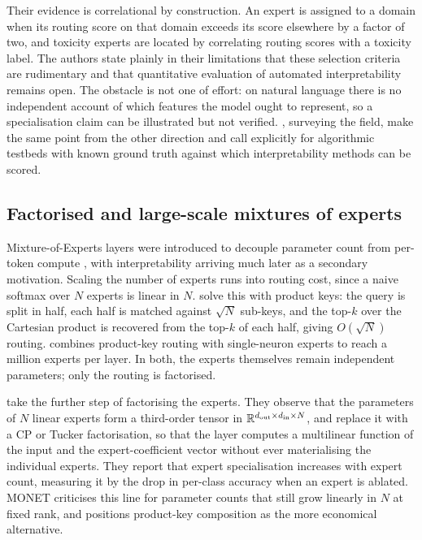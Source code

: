 Their evidence is correlational by construction. An expert is assigned to a
domain when its routing score on that domain exceeds its score elsewhere by a
factor of two, and toxicity experts are located by correlating routing scores
with a toxicity label. The authors state plainly in their limitations that
these selection criteria are rudimentary and that quantitative evaluation of
automated interpretability remains open. The obstacle is not one of effort: on
natural language there is no independent account of which features the model
ought to represent, so a specialisation claim can be illustrated but not
verified. \citet{bereska2024mechinterp}, surveying the field, make the same
point from the other direction and call explicitly for algorithmic testbeds
with known ground truth against which interpretability methods can be scored.

\subsection{Factorised and large-scale mixtures of experts}

Mixture-of-Experts layers were introduced to decouple parameter count from
per-token compute \citep{shazeer2017moe}, with interpretability arriving much
later as a secondary motivation. Scaling the number of experts runs into
routing cost, since a naive softmax over $N$ experts is linear in $N$.
\citet{lample2019productkeys} solve this with product keys: the query is split
in half, each half is matched against $\sqrt{N}$ sub-keys, and the top-$k$
over the Cartesian product is recovered from the top-$k$ of each half, giving
$O(\sqrt{N})$ routing. \citet{he2024peer} combines product-key routing with
single-neuron experts to reach a million experts per layer. In both, the
experts themselves remain independent parameters; only the routing is
factorised.

\citet{oldfield2024mumoe} take the further step of factorising the experts.
They observe that the parameters of $N$ linear experts form a third-order
tensor in $\mathbb{R}^{d_{\mathrm{out}} \times d_{\mathrm{in}} \times N}$, and replace
it with a CP or Tucker factorisation, so that the layer computes a multilinear
function of the input and the expert-coefficient vector without ever
materialising the individual experts. They report that expert specialisation
increases with expert count, measuring it by the drop in per-class accuracy
when an expert is ablated. MONET criticises this line for parameter counts
that still grow linearly in $N$ at fixed rank, and positions product-key
composition as the more economical alternative.

